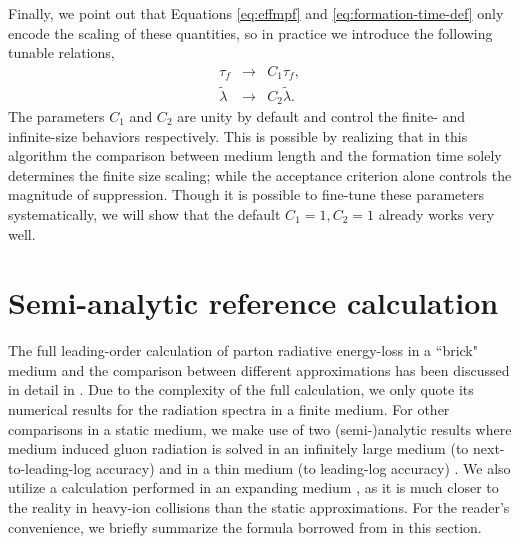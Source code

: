 \documentclass[aps, prc, reprint, amsmath, groupedaddress, nofootinbib]{revtex4-1}
\begin{document}
Finally, we point out that Equations \ref{eq:effmpf} and \ref{eq:formation-time-def} only encode the scaling of these quantities, so in practice we introduce the following tunable relations,
\begin{eqnarray}\label{eq:tune}
\nonumber
\tau_f & \rightarrow & C_1 \tau_f, \\
\tilde{\lambda} & \rightarrow & C_2 \tilde{\lambda}.
\end{eqnarray}
The parameters $C_1$ and $C_2$ are unity by default and control the finite- and infinite-size behaviors respectively. 
This is possible by realizing that in this algorithm the comparison between medium length and the formation time solely determines the finite size scaling; while the acceptance criterion alone controls the magnitude of suppression.
Though it is possible to fine-tune these parameters systematically, we will show that the default $C_1 = 1, C_2 = 1$ already works very well.


\section{Semi-analytic reference calculation}\label{section:Theo}
The full leading-order calculation of parton radiative energy-loss in a ``brick" medium and the comparison between different approximations has been discussed in detail in \cite{CaronHuot:2010bp}.
Due to the complexity of the full calculation, we only quote its numerical results for the radiation spectra in a finite medium.
For other comparisons in a static medium, we make use of two (semi-)analytic results where medium induced gluon radiation is solved in an infinitely large medium (to next-to-leading-log accuracy) \cite{Arnold:2008zu} and in a thin medium (to leading-log accuracy) \cite{Arnold:2009mr}.
We also utilize a calculation performed in an expanding medium \cite{Baier:1998yf}, as it is much closer to the reality in heavy-ion collisions than the static approximations.
For the reader's convenience, we briefly summarize the formula borrowed from \cite{Arnold:2008zu,Arnold:2009mr,Baier:1998yf} in this section.
\end{document}

